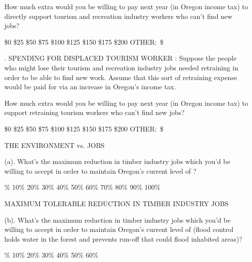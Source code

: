 \medskip\par\noindent
How much extra would you be willing to pay next year (in Oregon income tax) 
to {\twlbf directly support} tourism and recreation industry workers who 
can't find new jobs?
\medskip\par\noindent
\$0 \hfill \$25 \hfill \$50 \hfill \$75 \hfill \$100 \hfill \$125 \hfill \$150 \hfill
\$175 \hfill \$200 \hfill OTHER:~\$~\hbox{\vrule height 0.4pt width 0.5in}
\bigskip\bigskip\par\noindent
{. SPENDING FOR DISPLACED TOURISM WORKER :}\break
Suppose the people who might lose their tourism and recreation 
industry jobs needed retraining in order to be able to find new work. 
Assume that this sort of retraining 
expense would be paid for via an increase in Oregon's income tax.
\medskip\par\noindent
How much extra would you be willing to pay next year (in Oregon income tax)
to support {\twlbf retraining} tourism workers who can't find new jobs?
\medskip\par\noindent
\$0 \hfill \$25 \hfill \$50 \hfill \$75 \hfill \$100 \hfill \$125 \hfill \$150 \hfill
\$175 \hfill \$200 \hfill OTHER:~\$~\hbox{\vrule height 0.4pt width 0.5in}
\bigskip\bigskip\par\noindent
\vfill\eject
\bigskip\bigskip\par\noindent
\centerline{\twlbf THE ENVIRONMENT vs.  JOBS}
\bigskip\bigskip\par\noindent
{(a).} What's the maximum reduction in timber industry 
jobs which you'd be willing to accept in order to maintain Oregon's current
level of ?
\medskip\par{}\% \hfill 10\% \hfill 20\% \hfill 30\% \hfill 40\% \hfill 50\% \hfill 60\% \hfill 
70\% \hfill 80\% \hfill 90\% \hfill 100\%
\medskip\par\noindent
\centerline{MAXIMUM TOLERABLE REDUCTION IN TIMBER INDUSTRY JOBS}
\bigskip\bigskip\par\noindent
{(b).} What's the maximum reduction in timber industry 
jobs which you'd be willing to accept in order to maintain Oregon's current
level of  (flood control holds water in the forest
and prevents run-off that could flood inhabited areas)?
\medskip\par{}\% \hfill 10\% \hfill 20\% \hfill 30\% \hfill 40\% \hfill 50\% \hfill 60\% \hfill 
